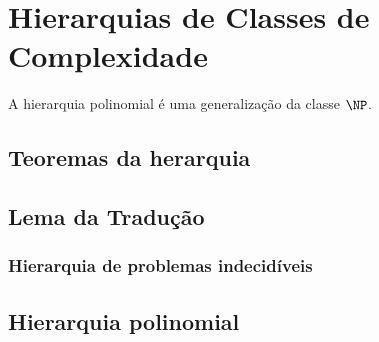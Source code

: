 \chapter{Hierarquias de Classes de Complexidade}

A hierarquia polinomial é uma generalização da classe $\NP$.



\section{Teoremas da herarquia}

\section{Lema da Tradução}



\subsection{Hierarquia de problemas indecidíveis}

\section{Hierarquia polinomial}
